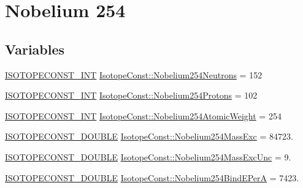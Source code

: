 \hypertarget{group___isotope_const-_nobelium-_no254}{}\section{Nobelium 254}
\label{group___isotope_const-_nobelium-_no254}
\subsection*{Variables}
\begin{DoxyCompactItemize}
\item 
\mbox{\hyperlink{group___isotope_const-_macros_ga5f18360b3e99483a35c32d789e62621c}{I\+S\+O\+T\+O\+P\+E\+C\+O\+N\+S\+T\+\_\+\+I\+NT}} \mbox{\hyperlink{group___isotope_const-_nobelium-_no254_ga15649c58d70903d1f985badaafc169e2}{Isotope\+Const\+::\+Nobelium254\+Neutrons}} = 152
\item 
\mbox{\hyperlink{group___isotope_const-_macros_ga5f18360b3e99483a35c32d789e62621c}{I\+S\+O\+T\+O\+P\+E\+C\+O\+N\+S\+T\+\_\+\+I\+NT}} \mbox{\hyperlink{group___isotope_const-_nobelium-_no254_gad578a4c7fb42040a0d64aca4004113f8}{Isotope\+Const\+::\+Nobelium254\+Protons}} = 102
\item 
\mbox{\hyperlink{group___isotope_const-_macros_ga5f18360b3e99483a35c32d789e62621c}{I\+S\+O\+T\+O\+P\+E\+C\+O\+N\+S\+T\+\_\+\+I\+NT}} \mbox{\hyperlink{group___isotope_const-_nobelium-_no254_gad0d2a0f65c2a3e2c0e19e3f6b872028a}{Isotope\+Const\+::\+Nobelium254\+Atomic\+Weight}} = 254
\item 
\mbox{\hyperlink{group___isotope_const-_macros_ga8f45a7272ce02c0b4c65c44636ed719a}{I\+S\+O\+T\+O\+P\+E\+C\+O\+N\+S\+T\+\_\+\+D\+O\+U\+B\+LE}} \mbox{\hyperlink{group___isotope_const-_nobelium-_no254_ga40907bd516ba0c7c80937ff8d4d10523}{Isotope\+Const\+::\+Nobelium254\+Mass\+Exc}} = 84723.
\item 
\mbox{\hyperlink{group___isotope_const-_macros_ga8f45a7272ce02c0b4c65c44636ed719a}{I\+S\+O\+T\+O\+P\+E\+C\+O\+N\+S\+T\+\_\+\+D\+O\+U\+B\+LE}} \mbox{\hyperlink{group___isotope_const-_nobelium-_no254_gab14f076947eb04963acc9ac62e0dfdad}{Isotope\+Const\+::\+Nobelium254\+Mass\+Exc\+Unc}} = 9.
\item 
\mbox{\hyperlink{group___isotope_const-_macros_ga8f45a7272ce02c0b4c65c44636ed719a}{I\+S\+O\+T\+O\+P\+E\+C\+O\+N\+S\+T\+\_\+\+D\+O\+U\+B\+LE}} \mbox{\hyperlink{group___isotope_const-_nobelium-_no254_ga36b31c52b37df5afcd92d955e859e242}{Isotope\+Const\+::\+Nobelium254\+Bind\+E\+PerA}} = 7423.
\item 

\end{DoxyCompactItemize}

